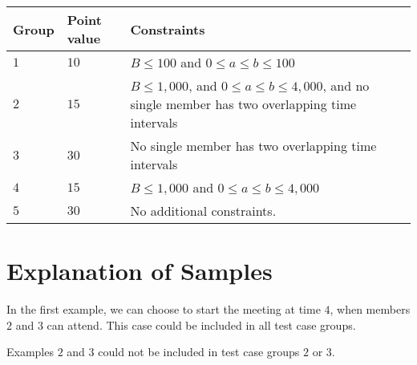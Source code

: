 \noindent
\begin{tabular}{| l | l | p{12cm} |}
  \hline
  \textbf{Group} & \textbf{Point value} & \textbf{Constraints} \\ \hline
  $1$   & $10$       & $B \leq 100$ and $0 \leq a \leq b \leq 100$ \\ \hline
  $2$   & $15$       & $B \leq 1,000$, and $0 \leq a \leq b \leq 4,000$, and no single member has two overlapping time intervals \\ \hline
  $3$   & $30$       & No single member has two overlapping time intervals \\ \hline
  $4$   & $15$       & $B \leq 1,000$ and $0 \leq a \leq b \leq 4,000$ \\ \hline
  $5$    & $30$        &  No additional constraints. \\ \hline
\end{tabular}

\section*{Explanation of Samples}
In the first example, we can choose to start the meeting at time $4$, when members $2$ and $3$ can attend.
This case could be included in all test case groups.

Examples $2$ and $3$ could not be included in test case groups $2$ or $3$.
